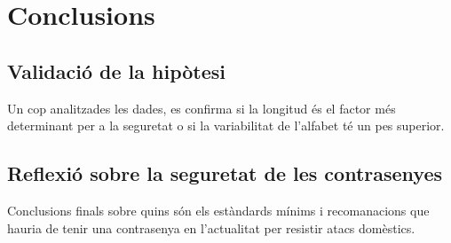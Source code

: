 \chapter{Conclusions}

\section{Validació de la hipòtesi}
Un cop analitzades les dades, es confirma si la longitud és el factor més determinant per a la seguretat o si la variabilitat de l'alfabet té un pes superior.

\section{Reflexió sobre la seguretat de les contrasenyes}
Conclusions finals sobre quins són els estàndards mínims i recomanacions que hauria de tenir una contrasenya en l'actualitat per resistir atacs domèstics.
